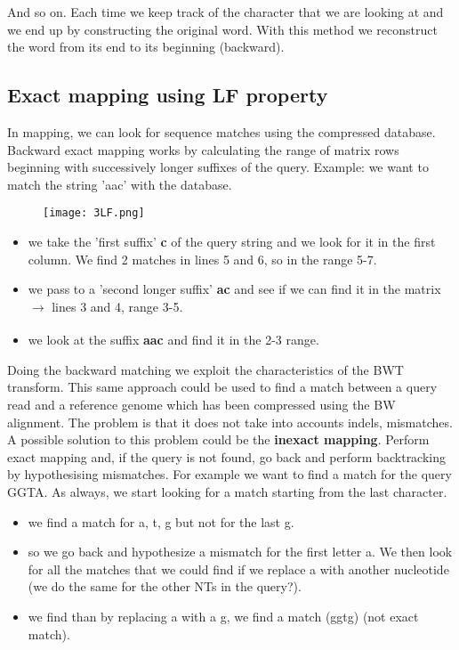 And so on. Each time we keep track of the character that we are looking at and we end up by constructing the original word. With this method we reconstruct the word from its end to its beginning (backward). 

\subsection{Exact mapping using LF property}

In mapping, we can look for sequence matches using the compressed database.
Backward exact mapping works by calculating the range of matrix rows beginning with successively longer suffixes of the query.
Example: we want to match the string 'aac' with the database.

\begin{figure}[h]
\centering
\texttt{[image: 3LF.png]}
\caption{}
\end{figure}

\begin{itemize}
    \item we take the 'first suffix' \textbf{c} of the query string and we look for it in the first column. We find 2 matches in lines 5 and 6, so in the range 5-7.
    \item we pass to a 'second longer suffix' \textbf{ac} and see if we can find it in the matrix $\xrightarrow[]{}$ lines 3 and 4, range 3-5.
    \item we look at the suffix \textbf{aac} and find it in the 2-3 range.
\end{itemize}

Doing the backward matching we exploit the characteristics of the BWT transform. This same approach could be used to find a match between a query read and a reference genome which has been compressed using the BW alignment.
The problem is that it does not take into accounts indels, mismatches. 
A possible solution to this problem could be the \textbf{inexact mapping}. 
Perform exact mapping and, if the query is not found, go back and perform backtracking by hypothesising mismatches. For example we want to find a match for the query GGTA. As always, we start looking for a match starting from the last character.

\begin{itemize}
    \item we find a match for a, t, g but not for the last g. 
    \item so we go back and hypothesize a mismatch for the first letter a. We then look for all the matches that we could find if we replace a with another nucleotide (we do the same for the other NTs in the query?). 
    \item we find than by replacing a with a g, we find a match (ggtg) (not exact match).
\end{itemize}

